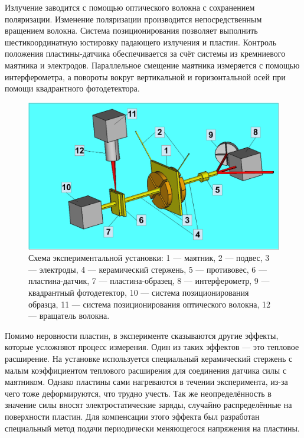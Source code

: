Излучение заводится с помощью оптического волокна с сохранением поляризации. Изменение поляризации производится непосредственным вращением волокна. Система позиционирования позволяет выполнить шестикоординатную юстировку падающего излучения и пластин. Контроль положения пластины-датчика обеспечивается за счёт системы из кремниевого маятника и электродов. Параллельное смещение маятника измеряется с помощью интерферометра, а повороты вокруг вертикальной и горизонтальной осей при помощи квадрантного фотодетектора.
\begin{figure}
    \centering
    \includegraphics[width=\textwidth]{figures/exp2.pdf}
    \caption{Схема экспериментальной установки: 1 --- маятник, 2 --- подвес, 3 --- электроды,  4 --- керамический стержень, 5 --- противовес, 6 --- пластина-датчик, 7 --- пластина-образец, 8 --- интерферометр, 9 --- квадрантный фотодетектор, 10 --- система позиционирования образца, 11 --- система позиционирования оптического волокна, 12 --- вращатель волокна.}
    \label{fig:exp_set_up}
\end{figure}

Помимо неровности пластин, в эксперименте сказываются другие эффекты, которые усложняют процесс измерения. Один из таких эффектов --- это тепловое расширение. На установке используется специальный керамический стержень с малым коэффициентом теплового расширения для соединения датчика силы с маятником. Однако пластины сами нагреваются в течении эксперимента, из-за чего тоже деформируются, что трудно учесть. Так же неопределённость в значение силы вносят электростатические заряды, случайно распределённые на поверхности пластин. Для компенсации этого эффекта был разработан специальный метод подачи периодически меняющегося напряжения на пластины.

